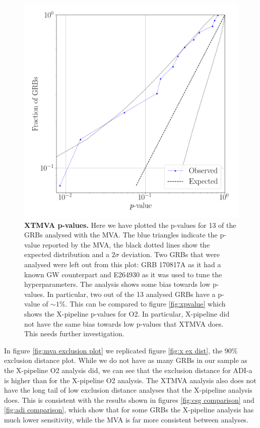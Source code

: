 \documentclass[11pt]{cuthesis}
\newcommand{\xp}{X-pipeline }
\begin{document}
\begin{figure} %
\begin{center}
\includegraphics[width=0.8\linewidth]{mva_pvalue.png}
\end{center}
\caption{\textbf{XTMVA p-values.} Here we have plotted the p-values for 13 of the GRBs analysed with the MVA. The blue triangles indicate the p-value reported by the MVA, the black dotted lines show the expected distribution and a $2\sigma$ deviation. Two GRBs that were analysed were left out from this plot: GRB 170817A as it had a known GW counterpart and E264930 as it was used to tune the hyperparameters. The analysis shows some bias towards low p-values. In particular, two out of the 13 analysed GRBs have a p-value of $\sim1\%$. This can be compared to figure \ref{fig:xpvalue} which shows the \xp p-values for O2. In particular, \xp did not have the same bias towards low p-values that XTMVA does. This needs further investigation.}
\label{fig:mva pvalues}
\end{figure}

In figure \ref{fig:mva exclusion plot} we replicated figure \ref{fig:x ex dist}, the 90\% exclusion distance plot. While we do not have as many GRBs in our sample as the \xp O2 analysis did, we can see that the exclusion distance for ADI-a is higher than for the \xp O2 analysis. The XTMVA analysis also does not have the long tail of low exclusion distance analyses that the \xp analysis does. This is consistent with the results shown in figures \ref{fig:csg comparison} and \ref{fig:adi comparison}, which show that for some GRBs the \xp analysis has much lower sensitivity, while the MVA is far more consistent between analyses. 
\end{document}
